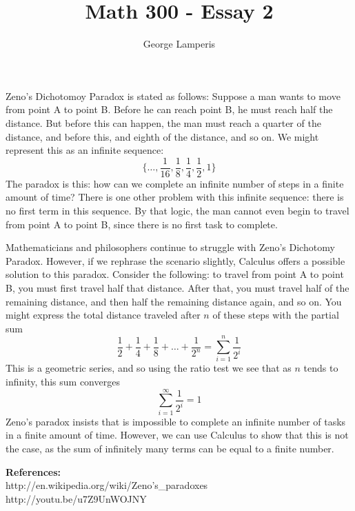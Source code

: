 \documentclass[12pt]{article}
\title{Math 300 - Essay 2}
\author{George Lamperis}
\date{}
\theoremstyle{mystyle}
\begin{document}
\maketitle

Zeno's Dichotomoy Paradox is stated as follows: Suppose a man wants to move from
point A to point B. Before he can reach point B, he must reach half the
distance. But before this can happen, the man must reach a quarter of the
distance, and before this, and eighth of the distance, and so on. We might
represent this as an infinite sequence:
$$ 
\{ \ldots, \frac{1}{16}, \frac{1}{8}, \frac{1}{4}, \frac{1}{2}, 1 \} 
$$
The paradox is this: how can we complete an infinite number of steps in a finite
amount of time? There is one other problem with this infinite sequence: there is
no first term in this sequence. By that logic, the man cannot even begin to
travel from point A to point B, since there is no first task to complete.

Mathematicians and philosophers continue to struggle with Zeno's
Dichotomy Paradox. However, if we rephrase the scenario slightly, Calculus
offers a possible solution to this paradox. Consider the following: to travel
from point A to point B, you must first travel half that distance. After that,
you must travel half of the remaining distance, and then half the remaining
distance again, and so on. You might express the total distance traveled
after $n$ of these steps with the partial sum
$$
\frac{1}{2} + \frac{1}{4} + \frac{1}{8} + \ldots + \frac{1}{2^n} = \sum_{i=1}^n \frac{1}{2^i} 
$$
This is a geometric series, and so using the ratio test we see that as $n$ tends
to infinity, this sum converges
$$
\sum_{i=1}^\infty \frac{1}{2^i} = 1
$$
Zeno's paradox insists that is impossible to complete an infinite number of
tasks in a finite amount of time. However, we can use Calculus to show
that this is not the case, as the sum of infinitely many terms can be
equal to a finite number. 

\noindent \textbf{References:} \\
http://en.wikipedia.org/wiki/Zeno's\_paradoxes \\
http://youtu.be/u7Z9UnWOJNY
\end{document}
